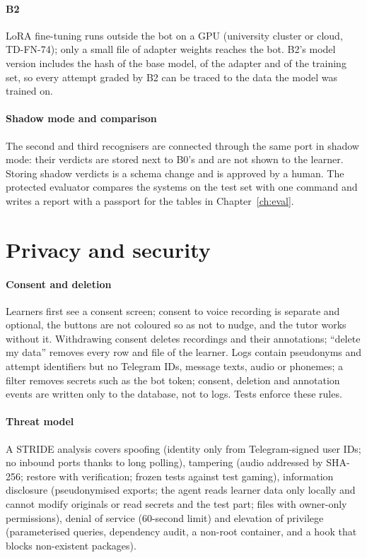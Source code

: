 \paragraph{B2} LoRA fine-tuning runs outside the bot on a GPU (university cluster or cloud, TD-FN-74); only a
small file of adapter weights reaches the bot. B2's model version includes the hash of the base model, of
the adapter and of the training set, so every attempt graded by B2 can be traced to the data the model was
trained on.

\paragraph{Shadow mode and comparison} The second and third recognisers are connected through the same port
in shadow mode: their verdicts are stored next to B0's and are not shown to the learner. Storing shadow
verdicts is a schema change and is approved by a human. The protected evaluator compares the systems on the
test set with one command and writes a report with a passport for the tables in Chapter~\ref{ch:eval}.

\section{Privacy and security}\label{sec:impl-privacy}

\paragraph{Consent and deletion} Learners first see a consent screen; consent to voice recording is separate
and optional, the buttons are not coloured so as not to nudge, and the tutor works without it. Withdrawing
consent deletes recordings and their annotations; ``delete my data'' removes every row and file of the learner.
Logs contain pseudonyms and attempt identifiers but no Telegram IDs, message texts, audio or phonemes; a
filter removes secrets such as the bot token; consent, deletion and annotation events are written only to the
database, not to logs. Tests enforce these rules.

\paragraph{Threat model} A STRIDE analysis covers spoofing (identity only from Telegram-signed user IDs; no
inbound ports thanks to long polling), tampering (audio addressed by SHA-256; restore with verification;
frozen tests against test gaming), information disclosure (pseudonymised exports; the agent reads learner
data only locally and cannot modify originals or read secrets and the test part; files with owner-only permissions), denial of service (60-second limit) and
elevation of privilege (parameterised queries, dependency audit, a non-root container, and a hook that blocks
non-existent packages).

